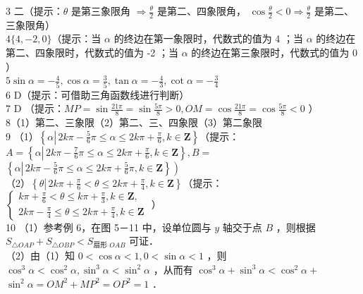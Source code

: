 \documentclass[10pt]{article}
\begin{document}
3 二（提示：\(\theta\) 是第三象限角 \(\Rightarrow \frac{\theta}{2}\) 是第二、四象限角， \(\cos \frac{\theta}{2}<0 \Rightarrow \frac{\theta}{2}\) 是第二、三象限角）\\
\(4\{4,-2,0\}\)（提示：当 \(\alpha\) 的终边在第一象限时，代数式的值为 4 ；当 \(\alpha\) 的终边在第二、四象限时，代数式的值为 -2 ；当 \(\alpha\) 的终边在第三象限时，代数式的值为 0 ）\\
\(5 \sin \alpha=-\frac{4}{5}, \cos \alpha=\frac{3}{5}, \tan \alpha=-\frac{4}{3}, \cot \alpha=-\frac{3}{4}\)\\
6 D（提示：可借助三角函数线进行判断）\\
7 D （提示：\(M P=\sin \frac{21 \pi}{8}=\sin \frac{5 \pi}{8}>0, O M=\cos \frac{21 \pi}{8}=\cos \frac{5 \pi}{8}<0\) ）\\
8（1）第二、三象限（2）第二、三、四象限（3）第二象限\\
9 （1）\(\left\{\alpha \left\lvert\, 2 k \pi-\frac{5}{6} \pi \leqslant \alpha \leqslant 2 k \pi+\frac{\pi}{6}\right., k \in \mathbf{Z}\right\}\)（提示：\(A=\left\{\alpha \left\lvert\, 2 k \pi-\frac{7}{6} \pi \leqslant \alpha \leqslant 2 k \pi+\frac{\pi}{6}\right., k \in \mathbf{Z}\right\}, B=\) \(\left.\left\{\alpha \left\lvert\, 2 k \pi-\frac{5}{6} \pi \leqslant \alpha \leqslant 2 k \pi+\frac{5}{6} \pi\right., k \in \mathbf{Z}\right\}\right)\)\\
（2）\(\left\{\theta \left\lvert\, 2 k \pi+\frac{\pi}{6}<\theta \leqslant 2 k \pi+\frac{\pi}{4}\right., k \in \mathbf{Z}\right\}\)（提示：\(\left\{\begin{array}{l}k \pi+\frac{\pi}{6}<\theta \leqslant k \pi+\frac{\pi}{3}, k \in \mathbf{Z}, \\ 2 k \pi-\frac{\pi}{4} \leqslant \theta \leqslant 2 k \pi+\frac{\pi}{4}, k \in \mathbf{Z}\end{array}\right.\) ）\\
10 （1）参考例 6，在图 5－11 中，设单位圆与 \(y\) 轴交于点 \(B\) ，则根据 \(S_{\triangle O A P}+S_{\triangle O B P}<S_{\text {扇形 } O A B}\) 可证．\\
（2）由（1）知 \(0<\cos \alpha<1,0<\sin \alpha<1\) ，则 \(\cos ^{3} \alpha<\cos ^{2} \alpha, \sin ^{3} \alpha<\sin ^{2} \alpha\) ，从而有 \(\cos ^{3} \alpha+\sin ^{3} \alpha<\cos ^{2} \alpha+\) \(\sin ^{2} \alpha=O M^{2}+M P^{2}=O P^{2}=1\) ．
\end{document}
